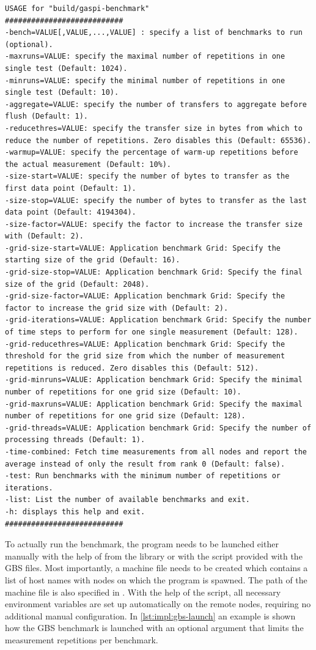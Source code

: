 \begin{lstlisting}[style=console,captionpos={b},caption={Description of all available program parameters.},label=lst:impl:gbs-help]
USAGE for "build/gaspi-benchmark"
###########################
-bench=VALUE[,VALUE,...,VALUE] : specify a list of benchmarks to run (optional).
-maxruns=VALUE: specify the maximal number of repetitions in one single test (Default: 1024).
-minruns=VALUE: specify the minimal number of repetitions in one single test (Default: 10).
-aggregate=VALUE: specify the number of transfers to aggregate before flush (Default: 1).
-reducethres=VALUE: specify the transfer size in bytes from which to reduce the number of repetitions. Zero disables this (Default: 65536).
-warmup=VALUE: specify the percentage of warm-up repetitions before the actual measurement (Default: 10%).
-size-start=VALUE: specify the number of bytes to transfer as the first data point (Default: 1).
-size-stop=VALUE: specify the number of bytes to transfer as the last data point (Default: 4194304).
-size-factor=VALUE: specify the factor to increase the transfer size with (Default: 2).
-grid-size-start=VALUE: Application benchmark Grid: Specify the starting size of the grid (Default: 16).
-grid-size-stop=VALUE: Application benchmark Grid: Specify the final size of the grid (Default: 2048).
-grid-size-factor=VALUE: Application benchmark Grid: Specify the factor to increase the grid size with (Default: 2).
-grid-iterations=VALUE: Application benchmark Grid: Specify the number of time steps to perform for one single measurement (Default: 128).
-grid-reducethres=VALUE: Application benchmark Grid: Specify the threshold for the grid size from which the number of measurement repetitions is reduced. Zero disables this (Default: 512).
-grid-minruns=VALUE: Application benchmark Grid: Specify the minimal number of repetitions for one grid size (Default: 10).
-grid-maxruns=VALUE: Application benchmark Grid: Specify the maximal number of repetitions for one grid size (Default: 128).
-grid-threads=VALUE: Application benchmark Grid: Specify the number of processing threads (Default: 1).
-time-combined: Fetch time measurements from all nodes and report the average instead of only the result from rank 0 (Default: false).
-test: Run benchmarks with the minimum number of repetitions or iterations.
-list: List the number of available benchmarks and exit.
-h: displays this help and exit.
###########################
\end{lstlisting}


To actually run the benchmark, the program needs to be launched either manually with the help of  from the \gpi library or with the  script provided with the \ac{GBS} files. Most importantly, a machine file needs to be created which contains a list of host names with nodes on which the program is spawned. The path of the machine file is also specified in . With the help of the  script, all necessary environment variables are set up automatically on the remote nodes, requiring no additional manual configuration. In \autoref{lst:impl:gbs-launch} an example is shown how the \ac{GBS} benchmark is launched with an optional argument that limits the measurement repetitions per benchmark.

